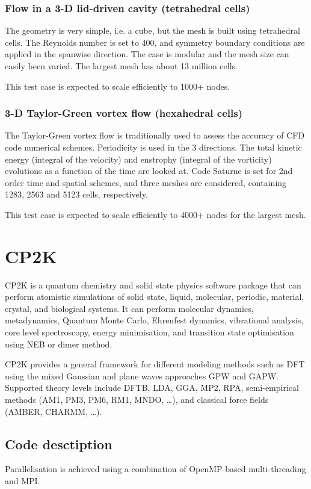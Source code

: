 \subsubsection{Flow in a 3-D lid-driven cavity (tetrahedral cells)}
The geometry is very simple, i.e. a cube, but the mesh is built using tetrahedral cells. The Reynolds number is set to 400, and symmetry boundary conditions are applied in the spanwise direction. The case is modular and the mesh size can easily been varied. The largest mesh has about 13 million cells.

This test case is expected to scale efficiently to 1000+ nodes.

\subsubsection{3-D Taylor-Green vortex flow (hexahedral cells)}
The Taylor-Green vortex flow is traditionally used to assess the accuracy of CFD code numerical schemes. Periodicity is used in the 3 directions. The total kinetic energy (integral of the velocity) and enstrophy (integral of the vorticity) evolutions as a function of the time are looked at. Code Saturne is set for 2nd order time and spatial schemes, and three meshes are considered, containing 1283, 2563 and 5123 cells, respectively.

This test case is expected to scale efficiently to 4000+ nodes for the largest mesh.

\section{CP2K}
CP2K is a quantum chemistry and solid state physics software package that can perform atomistic simulations of solid state, liquid, molecular, periodic, material, crystal, and biological systems. It can perform molecular dynamics, metadynamics, Quantum Monte Carlo, Ehrenfest dynamics, vibrational analysis, core level spectroscopy, energy minimisation, and transition state optimisation using NEB or dimer method.

CP2K provides a general framework for different modeling methods such as DFT using the mixed Gaussian and plane waves approaches GPW and GAPW. Supported theory levels include DFTB, LDA, GGA, MP2, RPA, semi-empirical methods (AM1, PM3, PM6, RM1, MNDO, …), and classical force fields (AMBER, CHARMM, …).

\subsection{Code desctiption}
Parallelisation is achieved using a combination of OpenMP-based multi-threading and MPI.

